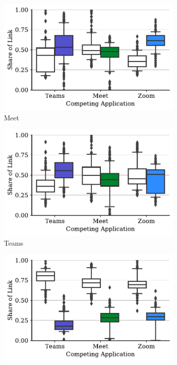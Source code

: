 \begin{figure}[t!]
    \centering
    \begin{subfigure}[t]{.33\textwidth}
        \centering
        \includegraphics[width=1\textwidth]{figures/comp/box_plot_meet_ul_0.5_all.pdf}
        \caption{Meet}
        \label{fig:meet_ul_box}
    \end{subfigure}\hfill
    \begin{subfigure}[t]{.33\textwidth}
        \centering
        \includegraphics[width=1\textwidth]{figures/comp/box_plot_teams_ul_0.5_all.pdf}
        \caption{Teams}
        \label{subfig:teams_ul_box}
    \end{subfigure}
    \begin{subfigure}[t]{.33\textwidth}
        \centering
        \includegraphics[width=1\textwidth]{figures/comp/box_plot_zoom_ul_0.5_all.pdf}

\end{subfigure}
\end{figure}
